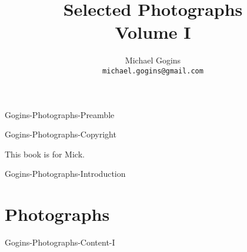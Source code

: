  {Gogins-Photographs-Preamble}

	\frontmatter
	\onecolumn
	
	\title{Selected Photographs \\ Volume I}
	\author{Michael Gogins \\ \texttt{michael.gogins@gmail.com}}
	
	\maketitle
	
	 {Gogins-Photographs-Copyright}
	
	\clearpage
	\begin{centering}
		This book is for Mick.
	\end{centering}
	
	\tableofcontents
	\listoffigures
	
	\mainmatter
	
	\pagestyle{headings}
	\twocolumn
	
	 {Gogins-Photographs-Introduction}	
	
	\chapter{Photographs}
	
	 {Gogins-Photographs-Content-I}
	



